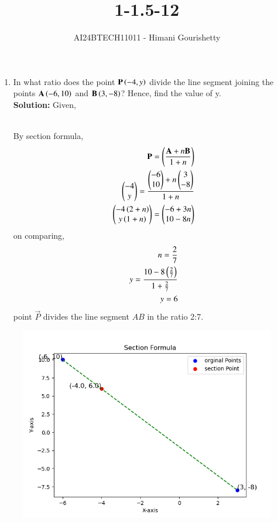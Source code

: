 \documentclass[journal,12pt,onecolumn]{IEEEtran}
\theoremstyle{remark}
\begin{document}

\vspace{3cm}

\title{1-1.5-12}
\author{AI24BTECH11011 - Himani Gourishetty}
\maketitle
\bigskip


\renewcommand{\thefigure}{\theenumi}
\renewcommand{\thetable}{\theenumi}
\begin{enumerate}
    \item In what ratio does the point $\mathbf{P}\left(-4,y\right)$ divide the line segment joining the points $\mathbf{A}\left(-6,10\right)$ and $\mathbf{B}\left(3,-8\right)$? Hence, find the value of y.\\
    \textbf{Solution:}
    Given,\\
\begin{table}[h!]    
\centering

\label{q2}
\end{table}
   \\ By section formula,
 \begin{align}
\mathbf{P}=\left(\frac{\mathbf{A}+n\mathbf{B}}{1+n}\right)\\
\begin{pmatrix}-4 \\ y\end{pmatrix} =\frac{\begin{pmatrix}-6 \\ 10\end{pmatrix}+n\begin{pmatrix}3 \\ -8\end{pmatrix}}{1+n}\\
 \begin{pmatrix}-4\left(2+n\right) \\ y\left(1+n\right)\end{pmatrix}=\begin{pmatrix}-6+3n \\ 10-8n\end{pmatrix}\\
\end{align}
on comparing,
 \begin{align}
n=\frac{2}{7}\\
y=\frac{10-8\left(\frac{2}{7}\right)}{1+\frac{2}{7}}\\
 y=6
  \end{align}
point $\vec{P}$ divides the line segment $AB$ in the ratio 2:7.
    
\end{enumerate}
\begin{figure}[ht]
   \centering
   \includegraphics[width=0.7\linewidth]{figs/q2.png}
   \label{q2}
\end{figure}
\end{document}

